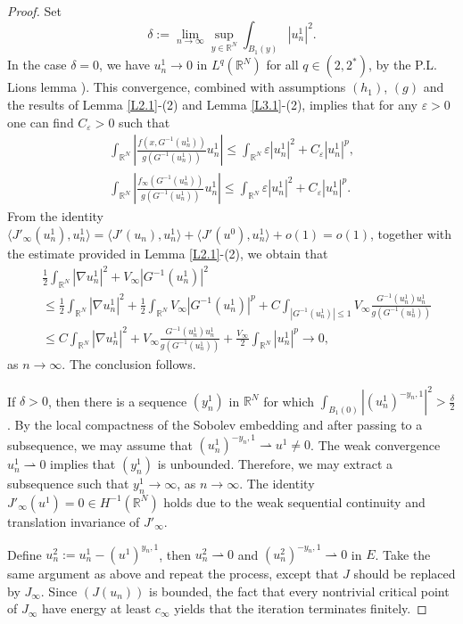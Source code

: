 \documentclass[10pt,a4paper]{amsart}
\numberwithin{equation}{section}
\begin{document}
\begin{proof}
Set
$$
\delta:=\lim_{n\to\infty}\sup_{y\in{\mathbb{R}^N}}\int_{B_1(y)}|u^1_n|^2.
$$
In the case $\delta = 0$, we  have \(u^1_n \to 0\) in \(L^q(\mathbb{R}^N)\) for all 
\(q \in (2, 2^*)\), by the P.L. Lions lemma \cite[Lemma 1.21 ]{Willem}). 
This convergence, combined with assumptions \((h_1)\), \((g)\) and the results of 
Lemma \ref{L2.1}-(2) and Lemma \ref{L3.1}-(2), implies that for any \(\varepsilon >0\) 
one can find \(C_{\varepsilon}>0\) such that 
\begin{gather*}
\int_{\mathbb{R}^N}|\frac{f(x,G^{-1}(u^1_n))}{g(G^{-1}(u^1_n))}u^1_n|\leq\int_{\mathbb{R}^N}\varepsilon|u^1_n|^2+C_\varepsilon|u^1_n|^p,
\\
\int_{\mathbb{R}^N}|\frac{f_\infty(G^{-1}(u^1_n))}{g(G^{-1}(u^1_n))}u^1_n|\leq\int_{\mathbb{R}^N}\varepsilon|u^1_n|^2+C_\varepsilon|u^1_n|^p.
\end{gather*}
From the identity $\langle J'_\infty(u^1_n),u^1_n\rangle=\langle J'(u_n),u^1_n\rangle+\langle J'(u^0),u^1_n\rangle+o(1)=o(1)$, 
together with the estimate provided in Lemma \ref{L2.1}-(2), we obtain that
\begin{align*}
&\frac{1}{2}\int_{\mathbb{R}^N}|\nabla u^1_n|^2+V_\infty|G^{-1}(u^1_n)|^2 \\
&\leq \frac{1}{2}\int_{\mathbb{R}^N}|\nabla u^1_n|^2+\frac{1}{2}\int_{\mathbb{R}^N}V_\infty|G^{-1}(u^1_n)|^p
 +C\int_{|G^{-1}(u^1_n)|\leq1}V_\infty\frac{G^{-1}(u^1_n)u^1_n}{g(G^{-1}(u^1_n))}\\
&\leq C\int_{\mathbb{R}^N}|\nabla u^1_n|^2+V_\infty\frac{G^{-1}(u^1_n)u^1_n}{g(G^{-1}(u^1_n))}
 +\frac{V_\infty}{2}\int_{\mathbb{R}^N}|u^1_n|^p \to  0,
\end{align*}
as $n\to\infty$. The conclusion follows.

If $\delta>0$, then there is a sequence \((y^1_n)\) in \(\mathbb{R}^N\) for which 
$\int_{B_1(0)}|(u^1_n)^{-y_n,1}|^2>\frac{\delta}{2}$. By the local compactness of the 
Sobolev embedding and after passing to a subsequence, we may assume that 
$(u^1_n)^{-y_n,1} \rightharpoonup u^1\neq0$. The weak convergence 
$u^1_n \rightharpoonup 0$ implies that $(y^1_n)$ is unbounded. Therefore, we may extract a subsequence such that $y^1_n \to \infty$, as $n \to \infty$. 
The identity $J'_\infty(u^1)=0\in H^{-1}({\mathbb{R}^N})$  holds due to the weak sequential continuity 
and translation invariance of $J'_\infty$. 

Define $u^2_n:=u^1_n-(u^1)^{y_n,1}$, then $u^2_n \rightharpoonup 0$ and 
$(u^2_n)^{-y_n,1} \rightharpoonup 0$ in $E$. Take the same argument as above and repeat 
the process, except that $J$ should be replaced by $J_\infty$.  
Since $(J(u_n))$ is bounded, the fact that every nontrivial critical point of $J_\infty$  have 
energy at least  $c_\infty$ yields that the iteration terminates finitely.
\end{proof}
\end{document}
